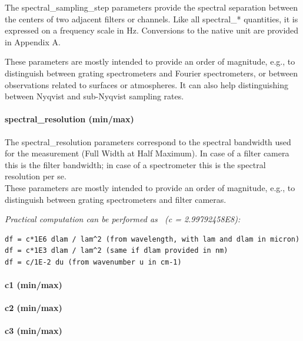 \documentclass[11pt,a4paper]{ivoa}
\begin{document}
The spectral\_sampling\_step parameters provide the spectral separation between the centers of two adjacent filters or channels. Like all spectral\_* quantities, it is expressed on a frequency scale in Hz. Conversions to the native unit are provided in Appendix A. 

These parameters are mostly intended to provide an order of magnitude, e.g., to distinguish between grating spectrometers and Fourier spectrometers, or between observations related to surfaces or atmospheres. It can also help distinguishing between Nyqvist and sub-Nyqvist sampling rates.

\paragraph{spectral\_resolution (min/max)}

The spectral\_resolution parameters correspond to the spectral bandwidth used for the measurement (Full Width at Half Maximum). In case of a filter camera this is the filter bandwidth; in case of a spectrometer this is the spectral resolution per se. \\ These parameters are mostly intended to provide an order of magnitude, e.g., to distinguish between grating spectrometers and filter cameras.

\emph{Practical computation can be performed as  (c = 2.99792458E8):}\\






\begin{verbatim}df = c*1E6 dlam / lam^2 (from wavelength, with lam and dlam in micron)
df = c*1E3 dlam / lam^2 (same if dlam provided in nm)
df = c/1E-2 du (from wavenumber u in cm-1)\end{verbatim}




\paragraph{c1 (min/max)}

\paragraph{c2 (min/max)}

\paragraph{c3 (min/max)}
\end{document}
